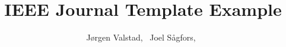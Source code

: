 \documentclass[journal]{IEEEtran}
\begin{document}
\title{IEEE Journal Template Example}

\author{Jørgen Valstad,~
        Joel Sågfors,~}%

\maketitle










\appendices






\end{document}
